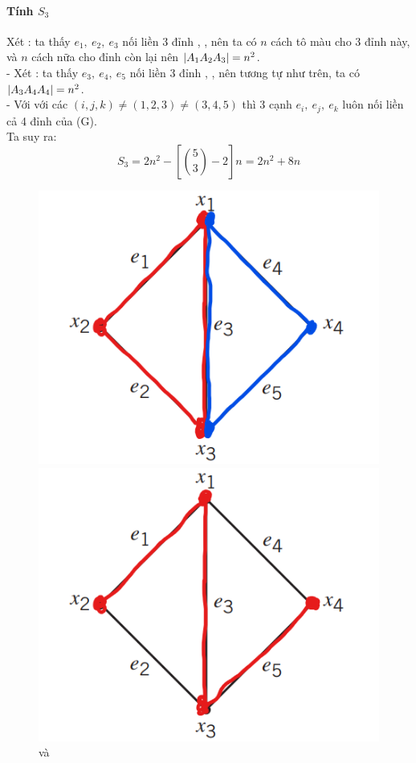 \documentclass[main.tex]{subfiles}
\begin{document}
\paragraph*{Tính $S_3$}
Xét : ta thấy $e_1,\ e_2,\ e_3$ nối liền 3 đỉnh , ,  nên ta có $n$ cách tô màu cho 3 đỉnh này, và $n$ cách nữa cho đỉnh còn lại nên $\left|A_1A_2A_3\right| = n^2$.\\
- Xét : ta thấy $e_3,\ e_4,\ e_5$ nối liền 3 đỉnh , ,  nên tương tự như trên, ta có $\left|A_3A_4A_4\right| = n^2$.\\ 
- Với  với các $(i,j,k) \neq (1, 2, 3) \neq (3, 4, 5)$ thì 3 cạnh $e_i,\ e_j,\ e_k$ luôn nối liền cả 4 đỉnh của (G).\\
Ta suy ra: 
$$
S_3 = 2n^2 - \left[{5\choose3}-2\right]n = 2n^2+8n
$$
\begin{figure}[H]
\centering
\begin{minipage}{0.25\textwidth}
\includegraphics[width=\textwidth]{image/Bai6_S3_1.png}
\captionsetup{labelformat=empty}
\caption{ và }
\end{minipage}
\begin{minipage}{0.25\textwidth}
\includegraphics[width=\textwidth]{image/Bai6_S3_2.png}

\end{minipage}
\end{figure}
\end{document}
